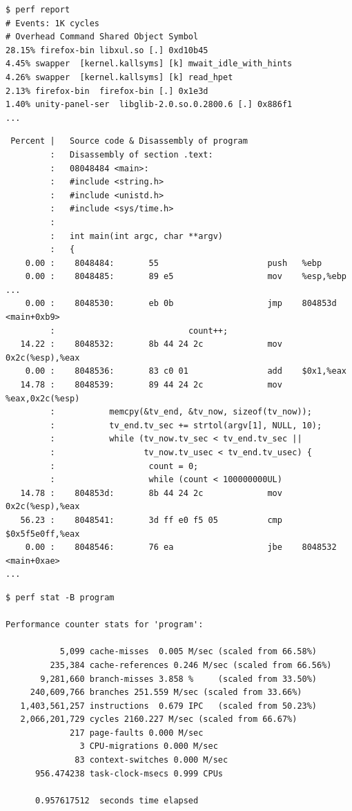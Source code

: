 \documentclass[a4paper]{report}
\begin{document}
\begin{lstlisting}
$ perf report
# Events: 1K cycles
# Overhead Command Shared Object Symbol
28.15% firefox-bin libxul.so [.] 0xd10b45
4.45% swapper  [kernel.kallsyms] [k] mwait_idle_with_hints
4.26% swapper  [kernel.kallsyms] [k] read_hpet
2.13% firefox-bin  firefox-bin [.] 0x1e3d
1.40% unity-panel-ser  libglib-2.0.so.0.2800.6 [.] 0x886f1
...
\end{lstlisting}

\begin{lstlisting}
 Percent |   Source code & Disassembly of program
         :   Disassembly of section .text:
         :   08048484 <main>:
         :   #include <string.h>
         :   #include <unistd.h>
         :   #include <sys/time.h>
         :
         :   int main(int argc, char **argv)
         :   {
    0.00 :    8048484:       55                      push   %ebp
    0.00 :    8048485:       89 e5                   mov    %esp,%ebp
...
    0.00 :    8048530:       eb 0b                   jmp    804853d <main+0xb9>
         :                           count++;
   14.22 :    8048532:       8b 44 24 2c             mov    0x2c(%esp),%eax
    0.00 :    8048536:       83 c0 01                add    $0x1,%eax
   14.78 :    8048539:       89 44 24 2c             mov    %eax,0x2c(%esp)
         :           memcpy(&tv_end, &tv_now, sizeof(tv_now));
         :           tv_end.tv_sec += strtol(argv[1], NULL, 10);
         :           while (tv_now.tv_sec < tv_end.tv_sec ||
         :                  tv_now.tv_usec < tv_end.tv_usec) {
         :                   count = 0;
         :                   while (count < 100000000UL)
   14.78 :    804853d:       8b 44 24 2c             mov    0x2c(%esp),%eax
   56.23 :    8048541:       3d ff e0 f5 05          cmp    $0x5f5e0ff,%eax
    0.00 :    8048546:       76 ea                   jbe    8048532 <main+0xae>
...
\end{lstlisting}

\begin{lstlisting}
$ perf stat -B program

Performance counter stats for 'program':

           5,099 cache-misses  0.005 M/sec (scaled from 66.58%)
         235,384 cache-references 0.246 M/sec (scaled from 66.56%)
       9,281,660 branch-misses 3.858 %     (scaled from 33.50%)
     240,609,766 branches 251.559 M/sec (scaled from 33.66%)
   1,403,561,257 instructions  0.679 IPC   (scaled from 50.23%)
   2,066,201,729 cycles 2160.227 M/sec (scaled from 66.67%)
             217 page-faults 0.000 M/sec
               3 CPU-migrations 0.000 M/sec
              83 context-switches 0.000 M/sec
      956.474238 task-clock-msecs 0.999 CPUs

      0.957617512  seconds time elapsed
\end{lstlisting}
\end{document}
